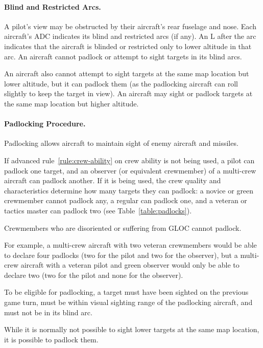 {\paragraph{Blind and Restricted Arcs.} A pilot's view may be obstructed by their aircraft's rear fuselage and nose. Each aircraft's ADC indicates its blind and restricted arcs (if any). An L after the arc indicates that the aircraft is blinded or restricted only to lower altitude in that arc. An aircraft cannot padlock or attempt to sight targets in its blind arcs. 

An aircraft also cannot attempt to sight targets at the same map location but lower altitude, but it can padlock them (as the padlocking aircraft can roll slightly to keep the target in view). An aircraft may sight or padlock targets at the same map location but higher altitude.

\paragraph{Padlocking Procedure.}

Padlocking allows aircraft to maintain sight of enemy aircraft and missiles.

If advanced rule~\ref{rule:crew-ability} on crew ability is not being used, a pilot can padlock one target, and an observer (or equivalent crewmember) of a multi-crew aircraft can padlock another. If it is being used, the crew quality and characteristics determine how many targets they can padlock: a novice or green crewmember cannot padlock any, a regular can padlock one, and a veteran or tactics master can padlock two (see Table~\ref{table:padlocks}). 

Crewmembers who are disoriented or suffering from GLOC cannot padlock.

For example, a multi-crew aircraft with two veteran crewmembers would be able to declare four padlocks (two for the pilot and two for the observer), but a multi-crew aircraft with a veteran pilot and green observer would only be able to declare two (two for the pilot and none for the observer).

To be eligible for padlocking, a target must have been sighted on the previous game turn, must be within visual sighting range of the padlocking aircraft, and must not be in its blind arc. 

While it is normally not possible to sight lower targets at the same map location, it is possible to padlock them.


}
